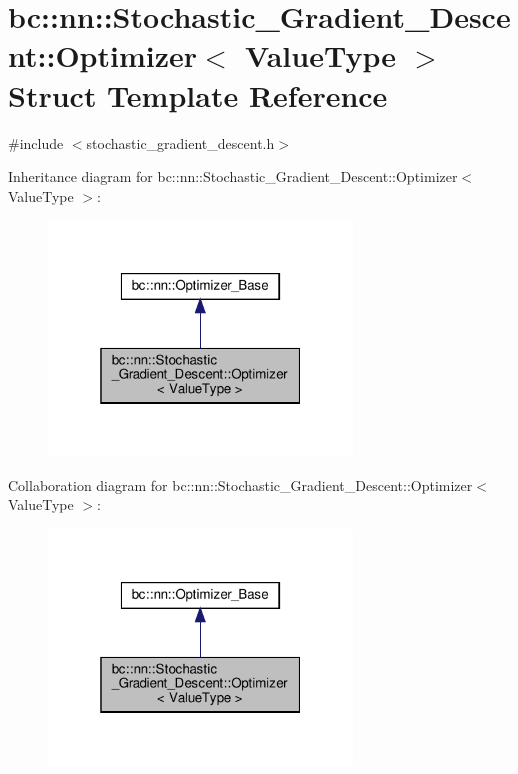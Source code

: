 \hypertarget{structbc_1_1nn_1_1Stochastic__Gradient__Descent_1_1Optimizer}{}\section{bc\+:\+:nn\+:\+:Stochastic\+\_\+\+Gradient\+\_\+\+Descent\+:\+:Optimizer$<$ Value\+Type $>$ Struct Template Reference}
\label{structbc_1_1nn_1_1Stochastic__Gradient__Descent_1_1Optimizer}


{\ttfamily \#include $<$stochastic\+\_\+gradient\+\_\+descent.\+h$>$}



Inheritance diagram for bc\+:\+:nn\+:\+:Stochastic\+\_\+\+Gradient\+\_\+\+Descent\+:\+:Optimizer$<$ Value\+Type $>$\+:\nopagebreak
\begin{figure}[H]
\begin{center}
\leavevmode
\includegraphics[width=229pt]{structbc_1_1nn_1_1Stochastic__Gradient__Descent_1_1Optimizer__inherit__graph}
\end{center}
\end{figure}


Collaboration diagram for bc\+:\+:nn\+:\+:Stochastic\+\_\+\+Gradient\+\_\+\+Descent\+:\+:Optimizer$<$ Value\+Type $>$\+:\nopagebreak
\begin{figure}[H]
\begin{center}
\leavevmode
\includegraphics[width=229pt]{structbc_1_1nn_1_1Stochastic__Gradient__Descent_1_1Optimizer__coll__graph}
\end{center}
\end{figure}
